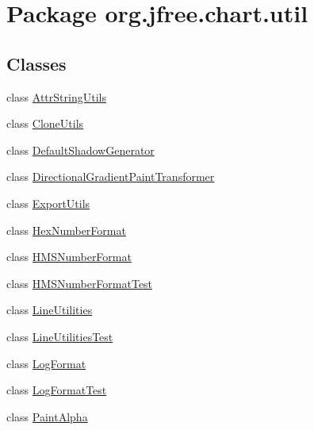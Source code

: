 \hypertarget{namespaceorg_1_1jfree_1_1chart_1_1util}{}\section{Package org.\+jfree.\+chart.\+util}
\label{namespaceorg_1_1jfree_1_1chart_1_1util}
\subsection*{Classes}
\begin{DoxyCompactItemize}
\item 
class \mbox{\hyperlink{classorg_1_1jfree_1_1chart_1_1util_1_1_attr_string_utils}{Attr\+String\+Utils}}
\item 
class \mbox{\hyperlink{classorg_1_1jfree_1_1chart_1_1util_1_1_clone_utils}{Clone\+Utils}}
\item 
class \mbox{\hyperlink{classorg_1_1jfree_1_1chart_1_1util_1_1_default_shadow_generator}{Default\+Shadow\+Generator}}
\item 
class \mbox{\hyperlink{classorg_1_1jfree_1_1chart_1_1util_1_1_directional_gradient_paint_transformer}{Directional\+Gradient\+Paint\+Transformer}}
\item 
class \mbox{\hyperlink{classorg_1_1jfree_1_1chart_1_1util_1_1_export_utils}{Export\+Utils}}
\item 
class \mbox{\hyperlink{classorg_1_1jfree_1_1chart_1_1util_1_1_hex_number_format}{Hex\+Number\+Format}}
\item 
class \mbox{\hyperlink{classorg_1_1jfree_1_1chart_1_1util_1_1_h_m_s_number_format}{H\+M\+S\+Number\+Format}}
\item 
class \mbox{\hyperlink{classorg_1_1jfree_1_1chart_1_1util_1_1_h_m_s_number_format_test}{H\+M\+S\+Number\+Format\+Test}}
\item 
class \mbox{\hyperlink{classorg_1_1jfree_1_1chart_1_1util_1_1_line_utilities}{Line\+Utilities}}
\item 
class \mbox{\hyperlink{classorg_1_1jfree_1_1chart_1_1util_1_1_line_utilities_test}{Line\+Utilities\+Test}}
\item 
class \mbox{\hyperlink{classorg_1_1jfree_1_1chart_1_1util_1_1_log_format}{Log\+Format}}
\item 
class \mbox{\hyperlink{classorg_1_1jfree_1_1chart_1_1util_1_1_log_format_test}{Log\+Format\+Test}}
\item 
class \mbox{\hyperlink{classorg_1_1jfree_1_1chart_1_1util_1_1_paint_alpha}{Paint\+Alpha}}
\item 

\end{DoxyCompactItemize}

